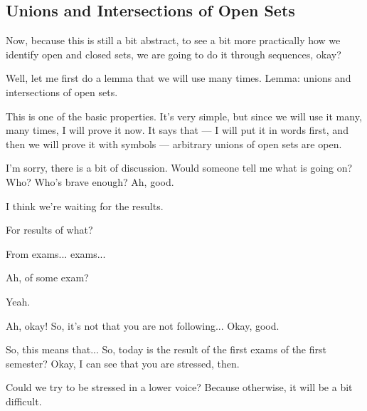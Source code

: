 \subsection{Unions and Intersections of Open Sets}

\begin{speech}[00:11:35 - 00:12:55]
Now, because this is still a bit abstract, to see a bit more practically how we identify open and closed sets, we are going to do it through sequences, okay?

Well, let me first do a lemma that we will use many times. Lemma: unions and intersections of open sets. 

This is one of the basic properties. It's very simple, but since we will use it many, many times, I will prove it now. It says that --- I will put it in words first, and then we will prove it with symbols --- arbitrary unions of open sets are open. 
\end{speech}

\begin{speech}[00:12:55 - 00:13:17]
I'm sorry, there is a bit of discussion. Would someone tell me what is going on? Who? Who's brave enough? Ah, good.
\end{speech}

\begin{student}
I think we're waiting for the results. 
\end{student}

\begin{speech}[00:13:21 - 00:13:24]
For results of what?
\end{speech}

\begin{student}
From exams... exams...
\end{student}

\begin{speech}[00:13:26 - 00:13:27]
Ah, of some exam?
\end{speech}

\begin{student}
Yeah.
\end{student}

\begin{speech}[00:13:28 - 00:14:09]
Ah, okay! So, it's not that you are not following...  Okay, good.

So, this means that... So, today is the result of the first exams of the first semester? Okay, I can see that you are stressed, then. 

Could we try to be stressed in a lower voice?  Because otherwise, it will be a bit difficult.
\end{speech}

